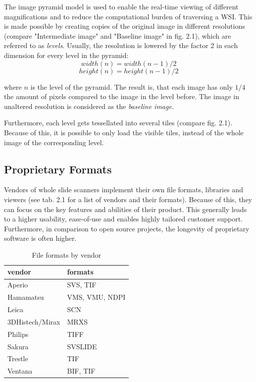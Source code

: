 The image pyramid model is used to enable the real-time viewing of different magnifications and to reduce the computational burden of traversing a WSI\cite{Park12}. This is made possible by creating copies of the original image in different resolutions (compare "Intermediate image" and "Baseline image" in fig. 2.1), which are referred to as \emph{levels}. Usually, the resolution is lowered by the factor 2 in each dimension for every level in the pyramid:
\begin{equation}
	width(n) = width(n-1) / 2
\end{equation}
\begin{equation}
	height(n) = height(n-1) / 2
\end{equation}

where $n$ is the level of the pyramid. The result is, that each image has only $1/4$ the amount of pixels compared to the image in the level before. The image in unaltered resolution is considered as the \emph{baseline image}\cite{web:openslide}.

Furthermore, each level gets tessellated into several tiles (compare fig. 2.1). Because of this, it is possible to only load the visible tiles, instead of the whole image of the corresponding level.


\subsection{Proprietary Formats}
Vendors of whole slide scanners implement their own file formats, libraries and viewers (see tab. 2.1 for a list of vendors and their formats). Because of this, they can focus on the key features and abilities of their product. This generally leads to a higher usability, ease-of-use and enables highly tailored customer support. Furthermore, in comparison to open source projects, the longevity of proprietary software is often higher\cite{Optimus15}.

\begin{table}[H]
	\begin{center}
		\begin{tabular}{| l | l |}
			\hline
			\textbf{vendor} & \textbf{formats}\\ \hline
			Aperio & SVS, TIF\\ \hline
			Hamamatsu & VMS, VMU, NDPI\\ \hline
			Leica & SCN\\ \hline
			3DHistech/Mirax & MRXS\\ \hline
			Philips & TIFF\\ \hline
			Sakura & SVSLIDE\\ \hline
			Trestle & TIF\\ \hline
			Ventana & BIF, TIF\\ \hline
		\end{tabular}
		\caption{File formats by vendor}
	\end{center}
\end{table}

